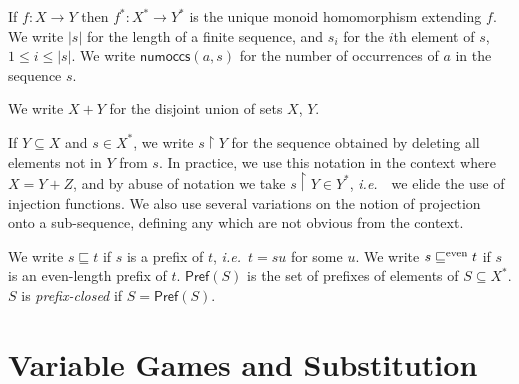 \documentclass[a4paper,11pt]{article}
\newcommand{\numoccs}[2]{\mathsf{numoccs}(#1 , #2 )}
\newcommand{\Pref}{\mathsf{Pref}}
\newcommand{\ie}{\textit{i.e.}\ }
\begin{document}
If $f:X\longrightarrow Y$ then $f^*:X^*\longrightarrow Y^*$ is the
unique
monoid homomorphism extending $f$.  We write $|s|$ for the length of a
finite sequence, and $s_i$ for the $i$th element of $s$,
$1\leq i\leq |s|$. We write $\numoccs{a}{s}$ for the number of occurrences of $a$ in the sequence $s$.

We write $X+Y$ for the disjoint union of sets $X$, $Y$.

If $Y\subseteq X$ and $s\in X^*$, we write $s\restriction Y$ for the
sequence obtained by deleting all elements not in $Y$ from $s$. In
practice, we use this notation in the context where $X = Y + Z$, and
by abuse of notation we take $s \restriction Y \in Y^{*}$, {\ie}\ we
elide the use of injection functions.
We also use several variations on the notion of projection onto a sub-sequence, defining any which are not obvious from the context.

We
write $s\sqsubseteq t$ if $s$ is a prefix of $t$, {\em i.e.}\ $t=su$
for some $u$. We write $s\sqsubseteq^{\mbox{{\scriptsize even}}} t$ if $s$ is an even-length prefix of $t$.
$\Pref(S)$ is the set of prefixes of elements of $S\subseteq X^*$.
$S$ is {\em prefix-closed} if $S=\Pref(S)$.




\section{Variable Games and Substitution}
\end{document}
